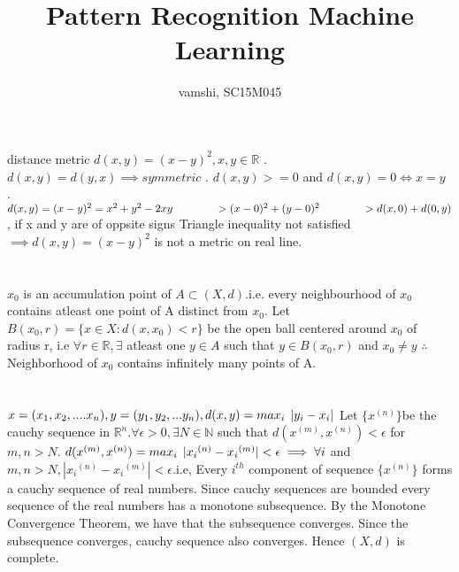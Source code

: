\documentclass[12pt,a4paper]{article}
\title{Pattern Recognition Machine Learning}
\author{vamshi, SC15M045}
\begin{document}
		\maketitle
		\newpage
		\section{}
		distance metric $ d(x,y) = (x-y)^2, x,y \in \mathbb{R} $ . $ d(x,y) = d(y,x) \implies symmetric $ . $ d(x,y) >= 0 $ and $ d(x,y)=0 \iff x=y $ . $ d(x,y) = (x-y)^2  = x^2+y^2-2xy \newline
		   \hspace*{9ex} > (x-0)^2 + (y-0)^2 \newline
		   \hspace*{9ex} >  d(x,0) + d(0,y)$, if x and y are of oppsite signs \newline
		   Triangle inequality not satisfied $ \implies d(x,y) = (x-y)^2 $ is not a metric on real line.
		   
		\section{}
		$x_0$ is an accumulation point of $ A \subset (X,d)$.i.e. every neighbourhood of $x_0$ contains atleast one point of A distinct from $x_0$. Let $B(x_0,r) = \{x \in X: d(x,x_0) < r\}$ be the open ball centered around $x_0$ of radius r, i.e $\forall r \in \mathbb{R}, \exists$ atleast one $y \in A $ such that $ y \in B(x_0,r) $ and $x_0 \neq y$ \newline
		$\therefore$ Neighborhood of $x_0$ contains infinitely many points of A.  
		
		\section{} 
		$x = (x_1, x_2,....x_n), y=(y_1, y_2,...y_n), d(x,y) = max_i \hspace*{1ex}|y_i-x_i|$\newline
		Let $\{x^{(n)}\} $be the cauchy sequence in $\mathbb{R}^n$.$ \forall \epsilon > 0, \exists N \in \mathbb{N}$ such that $d(x^{(m)},x^{(n)}) < \epsilon $ for $ m, n > N$.\newline
		$d(x^{(m)},x^{(n)}) = max_i \hspace*{1ex} |{x_i}^{(n)}-{x_i}^{(m)}| < \epsilon \implies \forall i$ and $m,n > N, |{x_i}^{(n)}-{x_i}^{(m)}| < \epsilon$.i.e, Every $i^{th}$ component of sequence $\{x^{(n)}\}$ forms a cauchy sequence of real numbers. Since cauchy sequences are bounded every sequence of the real numbers has a monotone subsequence. By the Monotone Convergence Theorem, we have that the subsequence converges. Since the subsequence converges, cauchy sequence also converges. Hence $(X,d)$ is complete.
		
\end{document}
